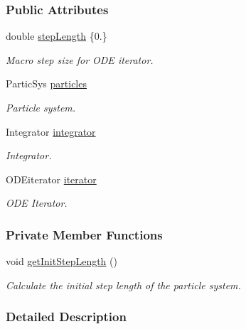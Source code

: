 \subsubsection*{Public Attributes}
\begin{DoxyCompactItemize}
\item 
double \mbox{\hyperlink{classdynamic_system_a0933282b8562cde1882defb383077c53}{step\+Length}} \{0.\}
\begin{DoxyCompactList}\small\item\em Macro step size for O\+DE iterator. \end{DoxyCompactList}\item 
Partic\+Sys \mbox{\hyperlink{classdynamic_system_aa61069ee367b9d1bb5bd2fedadba28fb}{particles}}
\begin{DoxyCompactList}\small\item\em Particle system. \end{DoxyCompactList}\item 
Integrator \mbox{\hyperlink{classdynamic_system_adf34beb841273d743821fd2df47e0aab}{integrator}}
\begin{DoxyCompactList}\small\item\em Integrator. \end{DoxyCompactList}\item 
O\+D\+Eiterator \mbox{\hyperlink{classdynamic_system_a4c308ab0538e69020fe50d1b53f94d25}{iterator}}
\begin{DoxyCompactList}\small\item\em O\+DE Iterator. \end{DoxyCompactList}\end{DoxyCompactItemize}
\subsubsection*{Private Member Functions}
\begin{DoxyCompactItemize}
\item 
void \mbox{\hyperlink{classdynamic_system_a9009d61ca09844f016ebc0d87467dba3}{get\+Init\+Step\+Length}} ()
\begin{DoxyCompactList}\small\item\em Calculate the initial step length of the particle system. \end{DoxyCompactList}\end{DoxyCompactItemize}


\subsubsection{Detailed Description}
